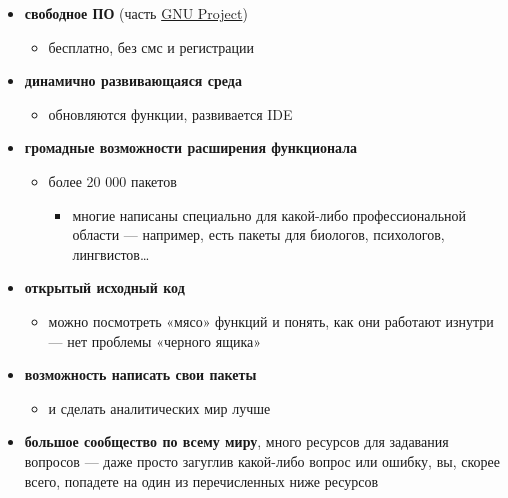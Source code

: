 \documentclass[
  letterpaper,
]{scrbook}
\providecommand{\tightlist}{%
  \setlength{\itemsep}{0pt}\setlength{\parskip}{0pt}}\usepackage{longtable,booktabs,array}
\theoremstyle{definition}
\theoremstyle{remark}
\begin{document}
\begin{itemize}
\tightlist
\item
  \textbf{свободное ПО} (часть
  \href{https://en.wikipedia.org/wiki/GNU_Project}{GNU Project})

  \begin{itemize}
  \tightlist
  \item
    бесплатно, без смс и регистрации
  \end{itemize}
\item
  \textbf{динамично развивающаяся среда}

  \begin{itemize}
  \tightlist
  \item
    обновляются функции, развивается IDE
  \end{itemize}
\item
  \textbf{громадные возможности расширения функционала}

  \begin{itemize}
  \tightlist
  \item
    более 20 000 пакетов

    \begin{itemize}
    \tightlist
    \item
      многие написаны специально для какой-либо профессиональной области
      --- например, есть пакеты для биологов, психологов,
      лингвистов\ldots{}
    \end{itemize}
  \end{itemize}
\item
  \textbf{открытый исходный код}

  \begin{itemize}
  \tightlist
  \item
    можно посмотреть «мясо» функций и понять, как они работают изнутри
    --- нет проблемы «черного ящика»
  \end{itemize}
\item
  \textbf{возможность написать свои пакеты}

  \begin{itemize}
  \tightlist
  \item
    и сделать аналитических мир лучше
  \end{itemize}
\item
  \textbf{большое сообщество по всему миру}, много ресурсов для
  задавания вопросов --- даже просто загуглив какой-либо вопрос или
  ошибку, вы, скорее всего, попадете на один из перечисленных ниже
  ресурсов


\end{itemize}
\end{document}
